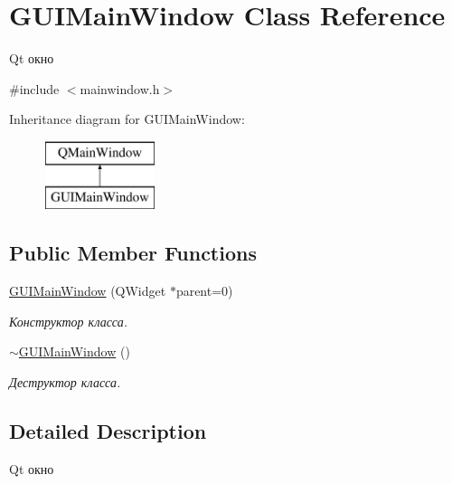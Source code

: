 \hypertarget{class_g_u_i_main_window}{}\section{G\+U\+I\+Main\+Window Class Reference}
\label{class_g_u_i_main_window}


Qt окно  




{\ttfamily \#include $<$mainwindow.\+h$>$}

Inheritance diagram for G\+U\+I\+Main\+Window\+:\begin{figure}[H]
\begin{center}
\leavevmode
\includegraphics[height=2.000000cm]{class_g_u_i_main_window}
\end{center}
\end{figure}
\subsection*{Public Member Functions}
\begin{DoxyCompactItemize}
\item 
\hyperlink{class_g_u_i_main_window_a15dd59ceaf094244961e4b66a5aa890a}{G\+U\+I\+Main\+Window} (Q\+Widget $\ast$parent=0)
\begin{DoxyCompactList}\small\item\em Конструктор класса. \end{DoxyCompactList}\item 
\hyperlink{class_g_u_i_main_window_a16ca27363f15a5f2678417bbf26880d2}{$\sim$\+G\+U\+I\+Main\+Window} ()\hypertarget{class_g_u_i_main_window_a16ca27363f15a5f2678417bbf26880d2}{}\label{class_g_u_i_main_window_a16ca27363f15a5f2678417bbf26880d2}

\begin{DoxyCompactList}\small\item\em Деструктор класса. \end{DoxyCompactList}\end{DoxyCompactItemize}


\subsection{Detailed Description}
Qt окно 

